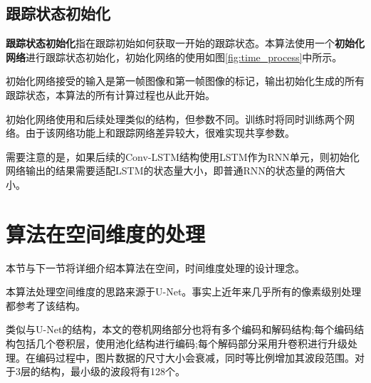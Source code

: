 \subsection{跟踪状态初始化}
\textbf{跟踪状态初始化}指在跟踪初始如何获取一开始的跟踪状态。本算法使用一个\textbf{初始化网络}进行跟踪状态初始化，初始化网络的使用如图\ref{fig:time_process}中所示。
\par
初始化网络接受的输入是第一帧图像和第一帧图像的标记，输出初始化生成的所有跟踪状态，本算法的所有计算过程也从此开始。
\par
初始化网络使用和后续处理类似的结构，但参数不同。训练时将同时训练两个网络。由于该网络功能上和跟踪网络差异较大，很难实现共享参数。
\par
需要注意的是，如果后续的Conv-LSTM结构使用LSTM作为RNN单元，则初始化网络输出的结果需要适配LSTM的状态量大小，即普通RNN的状态量的两倍大小。

\section{算法在空间维度的处理}
本节与下一节将详细介绍本算法在空间，时间维度处理的设计理念。
\par
本算法处理空间维度的思路来源于U-Net\supercite{ronneberger2015u}。事实上近年来几乎所有的像素级别处理都参考了该结构。
\par
类似与U-Net的结构，本文的卷机网络部分也将有多个编码和解码结构;每个编码结构包括几个卷积层，使用池化结构进行编码;每个解码部分采用升卷积进行升级处理。在编码过程中，图片数据的尺寸大小会衰减，同时等比例增加其波段范围。对于3层的结构，最小级的波段将有128个。

